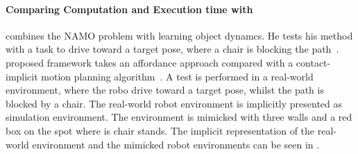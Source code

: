 




\paragraph{Comparing Computation and Execution time with \citeauthor{wang_affordancebased_2020}}
\citeauthor{wang_affordancebased_2020} combines the \ac{NAMO} problem with learning object dynamcs. He tests his method with a task to drive toward a target pose, where a chair is blocking the path~\cite{wang_affordancebased_2020}. \citeauthor{wang_affordancebased_2020} proposed framework takes an affordance approach compared with a contact-implicit motion planning algorithm~\cite{wang_affordancebased_2020}. A test is performed in a real-world environment, where the robo drive toward a target pose, whilst the path is blocked by a chair. The real-world robot environment is implicitly presented as simulation environment. The environment is mimicked with three walls and a red box on the spot where is chair stands. The implicit representation of the real-world environment and the mimicked robot environments can be seen in .\bs

